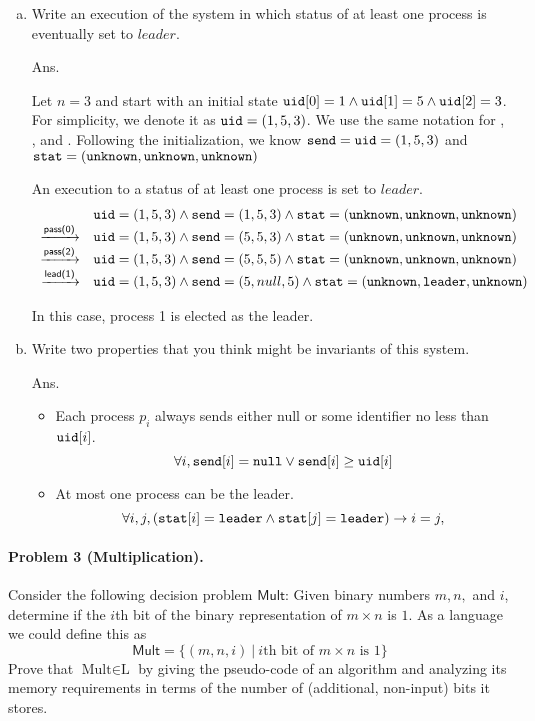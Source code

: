 \documentclass[11pt]{article}
\begin{document}
\begin{enumerate}[(a)]
\item Write an execution of the system in which status of at least one process is eventually set to $\mathit{leader}$.

Ans.

Let $n=3$ and start with an initial state $\mathtt{uid[}0\mathtt{]}=1 \land \mathtt{uid[}1\mathtt{]}=5 \land \mathtt{uid[}2\mathtt{]}=3$.
For simplicity, we denote it as $\mathtt{uid}=(1,5,3)$.
We use the same notation for \UID, \SEND, and \STAT.
Following the initialization, we know $\mathtt{send}=\mathtt{uid}=(1,5,3)$ and $\mathtt{stat}=(\mathtt{unknown},\mathtt{unknown},\mathtt{unknown})$

An execution to a status of at least one process is set to $\mathit{leader}$.
\[
\begin{array}{rl}
	                               & \mathtt{uid}=(1,5,3) \land \mathtt{send}=(1,5,3) \land \mathtt{stat}=(\mathtt{unknown},\mathtt{unknown},\mathtt{unknown}) \\
	\xrightarrow{\textsf{pass(0)}} & \mathtt{uid}=(1,5,3) \land \mathtt{send}=(5,5,3) \land \mathtt{stat}=(\mathtt{unknown},\mathtt{unknown},\mathtt{unknown}) \\
    \xrightarrow{\textsf{pass(2)}} & \mathtt{uid}=(1,5,3) \land \mathtt{send}=(5,5,5) \land \mathtt{stat}=(\mathtt{unknown},\mathtt{unknown},\mathtt{unknown}) \\
    \xrightarrow{\textsf{lead(1)}} & \mathtt{uid}=(1,5,3) \land \mathtt{send}=(5,null,5) \land \mathtt{stat}=(\mathtt{unknown},\mathtt{leader},\mathtt{unknown}) \\
\end{array}
\]

In this case, process 1 is elected as the leader.

\item Write two properties that you think might be invariants of this system.

Ans.
\begin{itemize}
    \item Each process $p_i$ always sends either null or some identifier no less than $\mathtt{uid[}i\mathtt{]}$.
        \[\forall i, \mathtt{send[}i\mathtt{]} = \mathtt{null} \lor \mathtt{send[}i\mathtt{]} \geq \mathtt{uid[}i\mathtt{]} \]
    \item At most one process can be the leader.
        \[\forall i,j, (\mathtt{stat[}i\mathtt{]} = \mathtt{leader} \land \mathtt{stat[}j\mathtt{]} = \mathtt{leader}) \to i=j,  \]
\end{itemize}
\end{enumerate}


\paragraph{Problem 3 (Multiplication).} 
Consider the following decision problem $\mathsf{Mult}$: Given binary
numbers $m,n,$ and $i$, determine if the $i$th bit of the binary
representation of $m\times n$ is $1$. As a language we could define
this as
\[
\mathsf{Mult} = \{(m,n,i)\: |\: \mbox{$i$th bit of $m\times n$ is $1$}\}
\]
Prove that $\mbox{Mult} \in \mbox{L}$ by giving the pseudo-code of an
algorithm and analyzing its memory requirements in terms of the number
of (additional, non-input) bits it stores.
\end{document}
